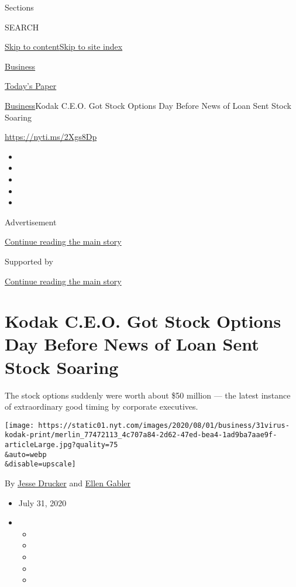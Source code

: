 Sections

SEARCH

\protect\hyperlink{site-content}{Skip to
content}\protect\hyperlink{site-index}{Skip to site index}

\href{https://www.nytimes.com/section/business}{Business}

\href{https://myaccount.nytimes.com/auth/login?response_type=cookie\&client_id=vi}{}

\href{https://www.nytimes.com/section/todayspaper}{Today's Paper}

\href{/section/business}{Business}\textbar{}Kodak C.E.O. Got Stock
Options Day Before News of Loan Sent Stock Soaring

\url{https://nyti.ms/2Xgs8Dp}

\begin{itemize}
\item
\item
\item
\item
\item
\end{itemize}

Advertisement

\protect\hyperlink{after-top}{Continue reading the main story}

Supported by

\protect\hyperlink{after-sponsor}{Continue reading the main story}

\hypertarget{kodak-ceo-got-stock-options-day-before-news-of-loan-sent-stock-soaring}{%
\section{Kodak C.E.O. Got Stock Options Day Before News of Loan Sent
Stock
Soaring}\label{kodak-ceo-got-stock-options-day-before-news-of-loan-sent-stock-soaring}}

The stock options suddenly were worth about \$50 million --- the latest
instance of extraordinary good timing by corporate executives.

\texttt{[image: https://static01.nyt.com/images/2020/08/01/business/31virus-kodak-print/merlin\_77472113\_4c707a84-2d62-47ed-bea4-1ad9ba7aae9f-articleLarge.jpg?quality=75\\\&auto=webp\\\&disable=upscale]}

By \href{https://www.nytimes.com/by/jesse-drucker}{Jesse Drucker} and
\href{https://nytimes.com/by/ellen-gabler/}{Ellen Gabler}

\begin{itemize}
\item
  July 31, 2020
\item
  \begin{itemize}
  \item
  \item
  \item
  \item
  \item
  \end{itemize}
\end{itemize}

